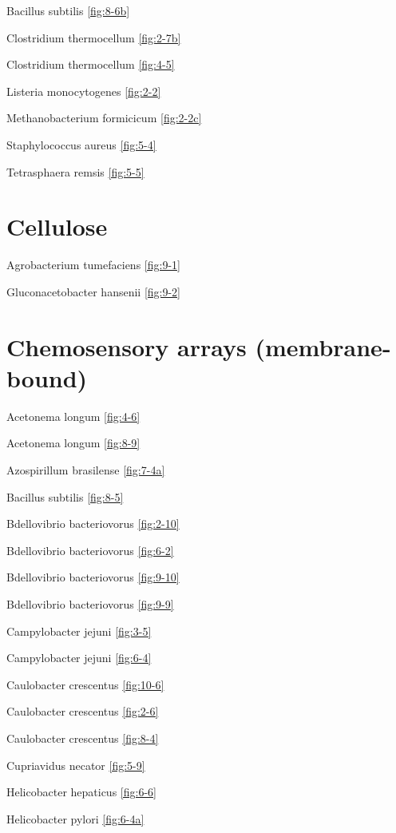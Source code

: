 \documentclass[]{tufte-book}
\begin{document}
Bacillus subtilis \ref{fig:8-6b}

Clostridium thermocellum \ref{fig:2-7b}

Clostridium thermocellum \ref{fig:4-5}

Listeria monocytogenes \ref{fig:2-2}

Methanobacterium formicicum \ref{fig:2-2c}

Staphylococcus aureus \ref{fig:5-4}

Tetrasphaera remsis \ref{fig:5-5}

\hypertarget{cellulose}{%
\section*{Cellulose}\label{cellulose}}

Agrobacterium tumefaciens \ref{fig:9-1}

Gluconacetobacter hansenii \ref{fig:9-2}

\hypertarget{chemosensory-arrays-membrane-bound}{%
\section*{Chemosensory arrays (membrane-bound)}\label{chemosensory-arrays-membrane-bound}}

Acetonema longum \ref{fig:4-6}

Acetonema longum \ref{fig:8-9}

Azospirillum brasilense \ref{fig:7-4a}

Bacillus subtilis \ref{fig:8-5}

Bdellovibrio bacteriovorus \ref{fig:2-10}

Bdellovibrio bacteriovorus \ref{fig:6-2}

Bdellovibrio bacteriovorus \ref{fig:9-10}

Bdellovibrio bacteriovorus \ref{fig:9-9}

Campylobacter jejuni \ref{fig:3-5}

Campylobacter jejuni \ref{fig:6-4}

Caulobacter crescentus \ref{fig:10-6}

Caulobacter crescentus \ref{fig:2-6}

Caulobacter crescentus \ref{fig:8-4}

Cupriavidus necator \ref{fig:5-9}

Helicobacter hepaticus \ref{fig:6-6}

Helicobacter pylori \ref{fig:6-4a}
\end{document}
